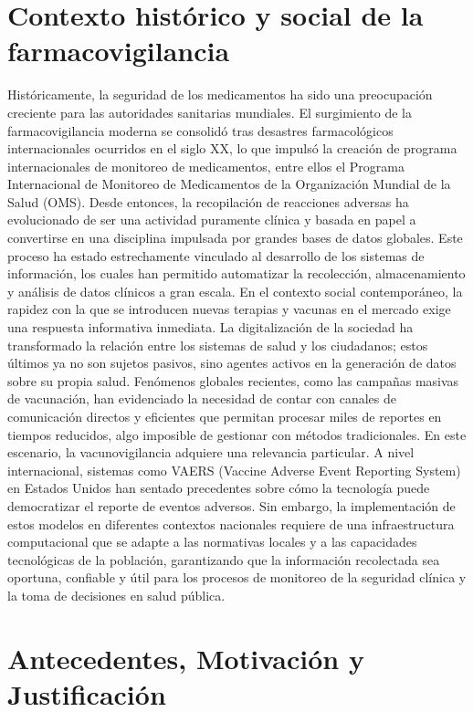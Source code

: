 \section{Contexto histórico y social de la farmacovigilancia}\label{section:contextoHistoricoSocial}
Históricamente, la seguridad de los medicamentos ha sido una preocupación creciente para las autoridades sanitarias mundiales. 
El surgimiento de la farmacovigilancia moderna se consolidó tras desastres farmacológicos internacionales ocurridos en el siglo XX, lo que impulsó la creación de programa internacionales de monitoreo de medicamentos, entre ellos el Programa Internacional de Monitoreo de Medicamentos de la Organización Mundial de la Salud (OMS). 
Desde entonces, la recopilación de reacciones adversas ha evolucionado de ser una actividad puramente clínica y basada en papel a convertirse en una disciplina impulsada por grandes bases de datos globales.
Este proceso ha estado estrechamente vinculado al desarrollo de los sistemas de información, los cuales han permitido automatizar la recolección, almacenamiento y análisis de datos clínicos a gran escala.
En el contexto social contemporáneo, la rapidez con la que se introducen nuevas terapias y vacunas en el mercado exige una respuesta informativa inmediata. La digitalización de la sociedad ha transformado la relación entre los sistemas de salud y los ciudadanos; estos últimos ya no son sujetos pasivos, sino agentes activos en la generación de datos sobre su propia salud. Fenómenos globales recientes, como las campañas masivas de vacunación, han evidenciado la necesidad de contar con canales de comunicación directos y eficientes que permitan procesar miles de reportes en tiempos reducidos, algo imposible de gestionar con métodos tradicionales.
En este escenario, la vacunovigilancia adquiere una relevancia particular.
A nivel internacional, sistemas como VAERS (Vaccine Adverse Event Reporting System) en Estados Unidos han sentado precedentes sobre cómo la tecnología puede democratizar el reporte de eventos adversos. Sin embargo, la implementación de estos modelos en diferentes contextos nacionales requiere de una infraestructura computacional que se adapte a las normativas locales y a las capacidades tecnológicas de la población, garantizando que la información recolectada sea oportuna, confiable y útil para los procesos de monitoreo de la seguridad clínica y la toma de decisiones en salud pública.

\section{Antecedentes, Motivación y Justificación}\label{section:antecedentesMotivacionJustificacion}

